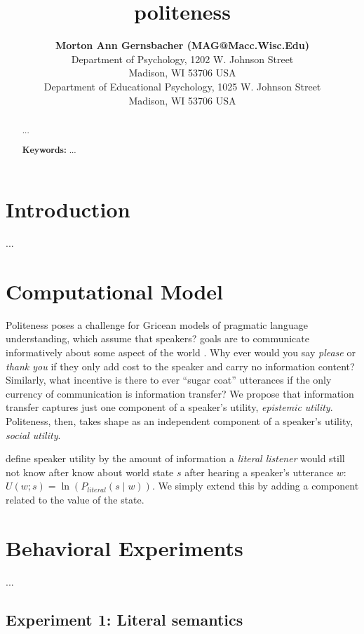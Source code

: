 \documentclass[10pt,letterpaper]{article}
\title{politeness}
\author{{\large \bf Morton Ann Gernsbacher (MAG@Macc.Wisc.Edu)} \\
  Department of Psychology, 1202 W. Johnson Street \\
  Madison, WI 53706 USA
  \AND {\large \bf Sharon J.~Derry (SDJ@Macc.Wisc.Edu)} \\
  Department of Educational Psychology, 1025 W. Johnson Street \\
  Madison, WI 53706 USA}
\begin{document}
\maketitle


\begin{abstract}

...

\textbf{Keywords:} 
...
\end{abstract}


\section{Introduction}

...

\section{Computational Model}

Politeness poses a challenge for Gricean models of pragmatic language understanding, which assume that speakers? goals are to communicate informatively about some aspect of the world \cite{Frank2012, Goodman2013}. 
Why ever would you say \emph{please} or \emph{thank you} if they only add cost to the speaker and carry no information content?
Similarly, what incentive is there to ever ``sugar coat'' utterances if the only currency of communication is information transfer? 
We propose that information transfer captures just one component of a speaker's utility, \emph{epistemic utility}.
Politeness, then, takes shape as an independent component of a speaker's utility, \emph{social utility}. 

 define speaker utility by the amount of information a \emph{literal listener} would still not know after know about world state $s$ after hearing a speaker's utterance $w$: 
$U(w; s) = \ln(P_{literal}(s \mid w)) $.
We simply extend this by adding a component related to the value of the state.



\section{Behavioral Experiments}

...

\subsection{Experiment 1: Literal semantics}
\end{document}
